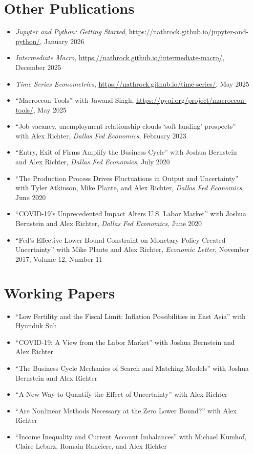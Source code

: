 \documentclass[10pt,letterpaper,en-US]{article}
\begin{document}
\section*{Other Publications}
\begin{itemize}
\item \emph{Jupyter and Python: Getting Started}, \href{https://nathrock.github.io/jupyter-and-python/}{https://nathrock.github.io/jupyter-and-python/}, January 2026
\item \emph{Intermediate Macro}, \href{https://nathrock.github.io/intermediate-macro/}{https://nathrock.github.io/intermediate-macro/}, December 2025
\item \emph{Time Series Econometrics}, \href{https://nathrock.github.io/time-series/}{https://nathrock.github.io/time-series/}, May 2025
\item ``Macroecon-Tools'' with Jawand Singh, \href{https://pypi.org/project/macroecon-tools/}{https://pypi.org/project/macroecon-tools/}, May 2025
\item ``Job vacancy, unemployment relationship clouds ‘soft landing’ prospects'' with Alex Richter, \emph{Dallas Fed Economics}, February 2023
\item ``Entry, Exit of Firms Amplify the Business Cycle'' with Joshua Bernstein and Alex Richter, \emph{Dallas Fed Economics}, July 2020
\item ``The Production Process Drives Fluctuations in Output and Uncertainty'' with Tyler Atkinson, Mike Plante, and Alex Richter, \emph{Dallas Fed Economics}, June 2020
\item ``COVID-19’s Unprecedented Impact Alters U.S. Labor Market'' with Joshua Bernstein and Alex Richter, \emph{Dallas Fed Economics}, June 2020
\item ``Fed's Effective Lower Bound Constraint on Monetary Policy Created Uncertainty'' with Mike Plante and Alex Richter, \emph{Economic Letter}, November 2017, Volume 12, Number 11
\end{itemize}

\section*{Working Papers}
\begin{itemize}
\item ``Low Fertility and the Fiscal Limit: Inflation Possibilities in East Asia'' with Hyunduk Suh
\item ``COVID-19: A View from the Labor Market'' with Joshua Bernstein and Alex Richter
\item ``The Business Cycle Mechanics of Search and Matching Models'' with Joshua Bernstein and Alex Richter
\item ``A New Way to Quantify the Effect of Uncertainty'' with Alex Richter
\item ``Are Nonlinear Methods Necessary at the Zero Lower Bound?'' with Alex Richter
\item ``Income Inequality and Current Account Imbalances'' with Michael Kumhof, Claire Lebarz, Romain Ranciere, and Alex Richter
\end{itemize}
\end{document}
